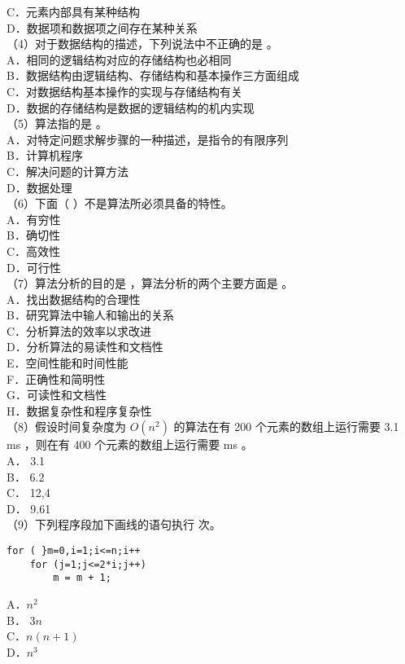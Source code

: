 \documentclass[12pt,a4paper]{amsart}
\begin{document}
C．元素内部具有某种结构\\
D．数据项和数据项之间存在某种关系\\
（4）对于数据结构的描述，下列说法中不正确的是 。\\
A．相同的逻辑结构对应的存储结构也必相同\\
B．数据结构由逻辑结构、存储结构和基本操作三方面组成\\
C．对数据结构基本操作的实现与存储结构有关\\
D．数据的存储结构是数据的逻辑结构的机内实现\\
（5）算法指的是 。\\
A．对特定问题求解步骤的一种描述，是指令的有限序列\\
B．计算机程序\\
C．解决问题的计算方法\\
D．数据处理\\
（6）下面（ ）不是算法所必须具备的特性。\\
A．有穷性\\
B．确切性\\
C．高效性\\
D．可行性\\
（7）算法分析的目的是 ，算法分析的两个主要方面是 。\\
A．找出数据结构的合理性\\
B．研究算法中输人和输出的关系\\
C．分析算法的效率以求改进\\
D．分析算法的易读性和文档性\\
E．空间性能和时间性能\\
F．正确性和简明性\\
G．可读性和文档性\\
H．数据复杂性和程序复杂性\\
（8）假设时间复杂度为 $O\left(n^{2}\right)$ 的算法在有 200 个元素的数组上运行需要 3.1 ms ，则在有 400 个元素的数组上运行需要 ms 。\\
A． 3.1\\
B． 6.2\\
C． 12,4\\
D． 9.61\\
（9）下列程序段加下画线的语句执行 次。

\begin{verbatim}
for ( }m=0,i=1;i<=n;i++
    for (j=1;j<=2*i;j++)
        m = m + 1;
\end{verbatim}

A．$n^{2}$\\
B． $3 n$\\
C．$n(n+1)$\\
D．$n^{3}$
\end{document}
